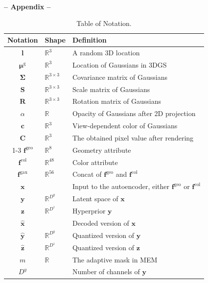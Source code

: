 \documentclass{article} %
\begin{document}
\centerline{\noindent\textbf{{\Large -- Appendix --}}}
\vspace{-10pt}
\begin{table}[H]
    \small
    \centering
    \renewcommand{\arraystretch}{0.95}
    \caption{Table of Notation.}
    \vspace{8pt}
    \begin{tabular}{cll}
    \toprule[2pt]
      \textbf{Notation} & \textbf{Shape}   & \textbf{Definition} \\
    \midrule[1pt]
        $\bm{l}$ &$\mathbb{R}^{3}$&A random 3D location\\
        $\bm{\mu}^\text{g}$ &$\mathbb{R}^{3}$&Location of Gaussians in 3DGS\\
        $\bm{\Sigma}$ &$\mathbb{R}^{3\times3}$&Covariance matrix of Gaussians\\
        $\bm{S}$ &$\mathbb{R}^{3\times3}$&Scale matrix of Gaussians\\
        $\bm{R}$ &$\mathbb{R}^{3\times3}$&Rotation matrix of Gaussians\\
        $\alpha$ &$\mathbb{R}$&Opacity of Gaussians after 2D projection\\
        $\bm{c}$ &$\mathbb{R}^{3}$&View-dependent color of Gaussians\\
        $\bm{C}$ &$\mathbb{R}^{3}$&The obtained pixel value after rendering\\
        \cline{1-3}
        $\bm{f}^{\text{geo}}$ &$\mathbb{R}^{8}$&Geometry attribute \\
        $\bm{f}^{\text{col}}$ &$\mathbb{R}^{48}$&Color attribute \\
        $\bm{f}^{\text{gau}}$ &$\mathbb{R}^{56}$&Concat of $\bm{f}^{\text{geo}}$ and $\bm{f}^{\text{col}}$ \\
        $\bm{x}$ &&Input to the autoencoder, either $\bm{f}^{\text{geo}}$ or $\bm{f}^{\text{col}}$ \\
        $\bm{y}$ &$\mathbb{R}^{D^y}$&Latent space of $\bm{x}$ \\
        $\bm{z}$ &$\mathbb{R}^{D^z}$&Hyperprior $\bm{y}$ \\
        $\hat{\bm{x}}$ &&Decoded version of $\bm{x}$ \\
        $\hat{\bm{y}}$ &$\mathbb{R}^{D^y}$&Quantized version of $\bm{y}$ \\
        $\hat{\bm{z}}$ &$\mathbb{R}^{D^z}$&Quantized version of $\bm{z}$ \\
        $m$ &$\mathbb{R}$&The adaptive mask in MEM  \\
        $D^y$ &&Number of channels of $\bm{y}$  \\

\end{tabular}
\end{table}
\end{document}
